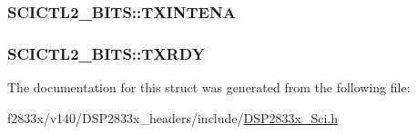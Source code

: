 \subsubsection[{T\+X\+I\+N\+T\+E\+N\+A}]{ S\+C\+I\+C\+T\+L2\+\_\+\+B\+I\+T\+S\+::\+T\+X\+I\+N\+T\+E\+N\+A}\label{struct_s_c_i_c_t_l2___b_i_t_s_af8fa2544ee6ef6724d617ff68a5a32fa}
\hypertarget{struct_s_c_i_c_t_l2___b_i_t_s_a1422489e431e53a8cfbc45e1ef31c882}{}
\subsubsection[{T\+X\+R\+D\+Y}]{ S\+C\+I\+C\+T\+L2\+\_\+\+B\+I\+T\+S\+::\+T\+X\+R\+D\+Y}\label{struct_s_c_i_c_t_l2___b_i_t_s_a1422489e431e53a8cfbc45e1ef31c882}


The documentation for this struct was generated from the following file\+:\begin{DoxyCompactItemize}
\item 
f2833x/v140/\+D\+S\+P2833x\+\_\+headers/include/\hyperlink{_d_s_p2833x___sci_8h}{D\+S\+P2833x\+\_\+\+Sci.\+h}\end{DoxyCompactItemize}
